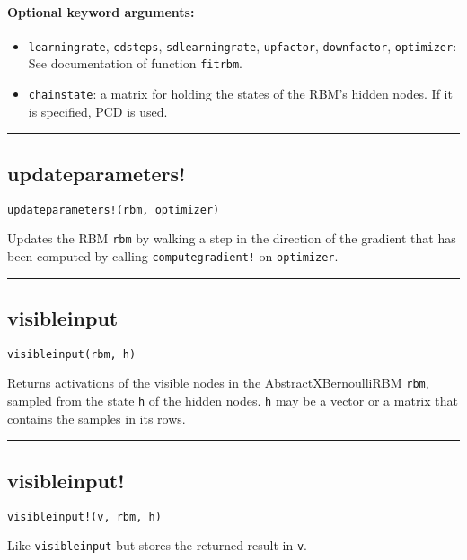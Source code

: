 \paragraph*{Optional keyword arguments:}
\begin{itemize}
\item \texttt{learningrate}, \texttt{cdsteps}, \texttt{sdlearningrate}, \texttt{upfactor}, \texttt{downfactor},  \texttt{optimizer}:  See documentation of function \texttt{fitrbm}.


\item \texttt{chainstate}: a matrix for holding the states of the RBM's hidden nodes. If  it is specified, PCD is used.

\end{itemize}
\noindent\rule{\textwidth}{1pt}
\subsection*{updateparameters!}  \label{bms_updateparameters!}
\begin{verbatim}
updateparameters!(rbm, optimizer)
\end{verbatim}
Updates the RBM \texttt{rbm} by walking a step in the direction of the gradient that has been computed by calling \texttt{computegradient!} on \texttt{optimizer}.

\noindent\rule{\textwidth}{1pt}
\subsection*{visibleinput}  \label{bms_visibleinput}
\begin{verbatim}
visibleinput(rbm, h)
\end{verbatim}
Returns activations of the visible nodes in the AbstractXBernoulliRBM \texttt{rbm}, sampled from the state \texttt{h} of the hidden nodes. \texttt{h} may be a vector or a matrix that contains the samples in its rows.

\noindent\rule{\textwidth}{1pt}
\subsection*{visibleinput!}  \label{bms_visibleinput!}
\begin{verbatim}
visibleinput!(v, rbm, h)
\end{verbatim}
Like \texttt{visibleinput} but stores the returned result in \texttt{v}.

